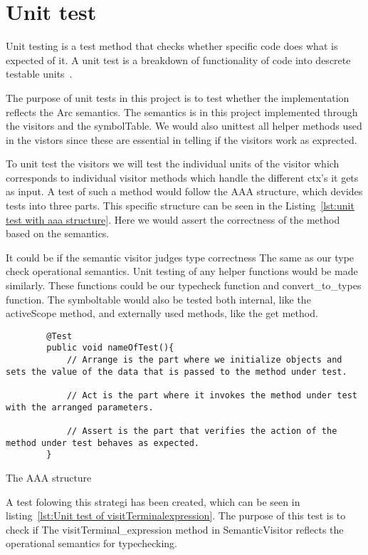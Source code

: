 \section{Unit test}\label{subsec:unittest}
Unit testing is a test method that checks whether specific code does what is expected of it. A unit test is a breakdown of functionality of code into descrete testable units~\cite{UnitTestBasic}.

The purpose of unit tests in this project is to test whether the implementation reflects the Arc semantics. The semantics is in this project implemented through the visitors and the symbolTable. We would also unittest all helper methods used in the vistors since these are essential in telling if the visitors work as exprected.

To unit test the visitors we will test the individual units of the visitor which corresponds to individual visitor methods which handle the different ctx's it gets as input. A test of such a method would follow the AAA structure, which devides tests into three parts. This specific structure can be seen in the Listing~\ref{lst:unit test with aaa structure}. Here we would assert the correctness of the method based on the semantics.

It could be if the semantic visitor judges type correctness The same as our type check operational semantics. Unit testing of any helper functions would be made similarly. These functions could be our typecheck function and convert\_to\_types function. The symboltable would also be tested both internal, like the activeScope method, and externally used methods, like the get method.

\begin{listing}[htb!]
    \begin{verbatim}
        @Test
        public void nameOfTest(){
            // Arrange is the part where we initialize objects and sets the value of the data that is passed to the method under test.

            // Act is the part where it invokes the method under test with the arranged parameters.

            // Assert is the part that verifies the action of the method under test behaves as expected. 
        }
    \end{verbatim}
    \caption{The AAA structure}
    \label{lst:unit test with aaa structure}
\end{listing}


A test folowing this strategi has been created, which can be seen in listing~\ref{lst:Unit test of visitTerminalexpression}. The purpose of this test is to check if The visitTerminal\_expression method in SemanticVisitor reflects the operational semantics for typechecking.

